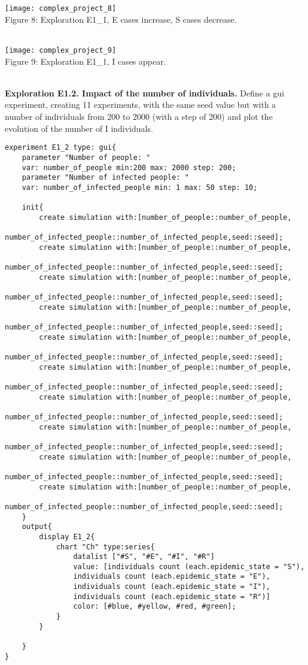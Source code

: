 \documentclass{article}
\begin{document}
\\\\
\texttt{[image: complex\_project\_8]}
\\
\caption{Figure 8: Exploration E1\_1, E cases increase, S cases decrease.}
\\
\texttt{[image: complex\_project\_9]}
\\
\caption{Figure 9: Exploration E1\_1, I cases appear.}
\\
\textbf{Exploration E1.2. Impact of the number of individuals.}
Define a gui experiment, creating 11 experiments, with the same seed value but with a number of individuals from 200 to 2000 (with a step of 200) and plot the evolution of the number of I individuals.
\begin{lstlisting}
experiment E1_2 type: gui{
	parameter "Number of people: " 
	var: number_of_people min:200 max: 2000 step: 200;
	parameter "Number of infected people: " 
	var: number_of_infected_people min: 1 max: 50 step: 10;
	
	init{
		create simulation with:[number_of_people::number_of_people,
		number_of_infected_people::number_of_infected_people,seed::seed];
		create simulation with:[number_of_people::number_of_people,
		number_of_infected_people::number_of_infected_people,seed::seed];
		create simulation with:[number_of_people::number_of_people,
		number_of_infected_people::number_of_infected_people,seed::seed];
		create simulation with:[number_of_people::number_of_people,
		number_of_infected_people::number_of_infected_people,seed::seed];
		create simulation with:[number_of_people::number_of_people,
		number_of_infected_people::number_of_infected_people,seed::seed];
		create simulation with:[number_of_people::number_of_people,
		number_of_infected_people::number_of_infected_people,seed::seed];
		create simulation with:[number_of_people::number_of_people,
		number_of_infected_people::number_of_infected_people,seed::seed];
		create simulation with:[number_of_people::number_of_people,
		number_of_infected_people::number_of_infected_people,seed::seed];
		create simulation with:[number_of_people::number_of_people,
		number_of_infected_people::number_of_infected_people,seed::seed];
		create simulation with:[number_of_people::number_of_people,
		number_of_infected_people::number_of_infected_people,seed::seed];
	}
	output{
		display E1_2{
			chart "Ch" type:series{
				datalist ["#S", "#E", "#I", "#R"] 
				value: [individuals count (each.epidemic_state = "S"), 					
				individuals count (each.epidemic_state = "E"),  					
				individuals count (each.epidemic_state = "I"), 				
				individuals count (each.epidemic_state = "R")] 		  					
				color: [#blue, #yellow, #red, #green];
			}
		}
		
	}
}
\end{lstlisting}
\end{document}
